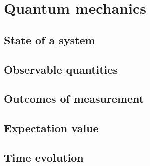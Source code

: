 \chapter{Quantum mechanics}

\section{State of a system}

\section{Observable quantities}

\section{Outcomes of measurement}

\section{Expectation value}

\section{Time evolution}
